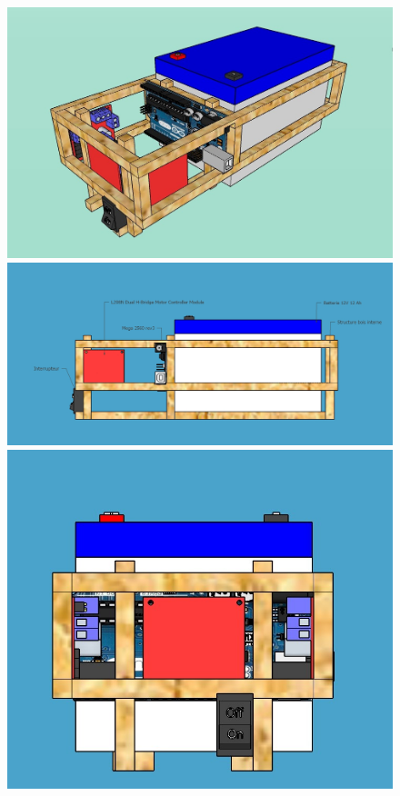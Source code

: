 \documentclass[11pt,a4paper]{article}
\begin{document}
        \begin{figure}[H]
          \centering
          \includegraphics[scale=0.4]{ROVInterieurVueGlobale.jpg}
          \includegraphics[scale=0.4]{ROVInterieurGauche.jpg}
          \includegraphics[scale=0.4]{ROVInterieurFace.jpg}
        \end{figure}
\end{document}
